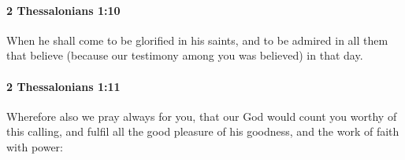 		\paragraph{2 Thessalonians 1:10} %
			\label{2THESSALONIANS-1-10}

			When he shall come to be glorified in his saints, and to be admired in all them that believe (because our testimony among you was believed) in that day.

			\begin{framed}
			\scriptsize
				\begin{compactdesc}
					\item[SBLG] 
				\end{compactdesc}
			\end{framed}

		\paragraph{2 Thessalonians 1:11} %
			\label{2THESSALONIANS-1-11}

			Wherefore also we pray always for you, that our God would count you worthy of this calling, and fulfil all the good pleasure of his goodness, and the work of faith with power:

